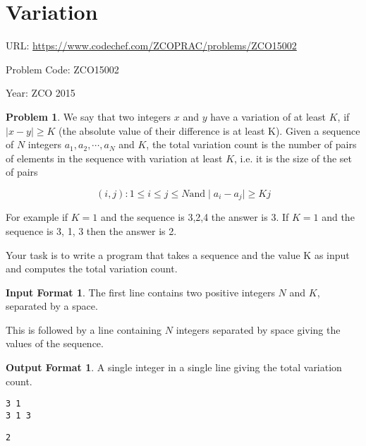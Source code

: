 \documentclass[twoside,12pt,a4paper,english]{book}
\theoremstyle{definition}
\theoremstyle{problemstyle}
\newtheorem*{problem}{Problem} %
\theoremstyle{problemstyle}
\newtheorem*{input_st}{Input Format} %
\theoremstyle{problemstyle}
\newtheorem*{output_st}{Output Format} %
\begin{document}
\newpage

\section{Variation}

URL: \url{https://www.codechef.com/ZCOPRAC/problems/ZCO15002}

Problem Code: ZCO15002

Year: ZCO 2015

\begin{problem}

We say that two integers $x$ and $y$ have a variation of at least $K$, if $\mid x - y\mid \geq K$ (the absolute value of their difference is at least K). Given a sequence of $N$ integers $a_1,a_2,\cdots,a_N$ and $K$, the total variation count is the number of pairs of elements in the sequence with variation at least $K$, i.e. it is the size of the set of pairs

$$(i,j): 1\leq i \leq j \leq N \text{and} \mid a_i - a_j\mid \geq K j$$

For example if $K = 1$ and the sequence is 3,2,4 the answer is 3. If $K = 1$ and the sequence is 3, 1, 3 then the answer is 2.


Your task is to write a program that takes a sequence and the value K as input and computes the total variation count.

\end{problem}


\begin{input_st}
The first line contains two positive integers $N$ and $K$, separated by a space.

This is followed by a line containing $N$ integers separated by space giving the values of the sequence.
\end{input_st}

\begin{output_st}

A single integer in a single line giving the total variation count.

\end{output_st}

\begin{tcolorbox}[title=Example]
\begin{lstlisting}
3 1 
3 1 3
\end{lstlisting}
\tcblower
\begin{lstlisting}
2
\end{lstlisting}
\end{tcolorbox}
\end{document}
